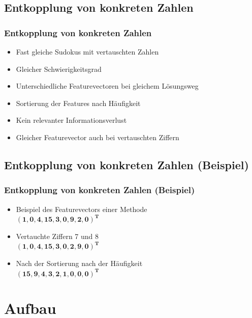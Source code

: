 \documentclass[accentcolor=tud6b,colorbacktitle,inverttitle,landscape,german,presentation,t]{tudbeamer}
\begin{document}
	\subsection{Entkopplung von konkreten Zahlen}
		\begin{frame}
		\frametitle{Entkopplung von konkreten Zahlen}
		\begin{itemize}
		\item Fast gleiche Sudokus mit vertauschten Zahlen
		\item Gleicher Schwierigkeitsgrad
		\item Unterschiedliche Featurevectoren bei gleichem Lösungsweg
		\item Sortierung der Features nach Häufigkeit
		\item Kein relevanter Informationsverlust
		\item Gleicher Featurevector auch bei vertauschten Ziffern
		\end{itemize}
		\end{frame}

	\subsection{Entkopplung von konkreten Zahlen (Beispiel)}
		\begin{frame}
		\frametitle{Entkopplung von konkreten Zahlen (Beispiel)}
		\begin{itemize}
		\item Beispiel des Featurevectors einer Methode\\$\mathbf{(1, 0, 4, 15, 3, 0, 9, 2, 0)^{T}}$
		\item Vertauchte Ziffern 7 und 8\\$\mathbf{(1, 0, 4, 15, 3, 0, 2, 9, 0)^{T}}$
		\item Nach der Sortierung nach der Häufigkeit\\$\mathbf{(15, 9, 4, 3, 2, 1, 0, 0, 0)^{T}}$
		\end{itemize}
		\end{frame}

\section{Aufbau}
\end{document}

